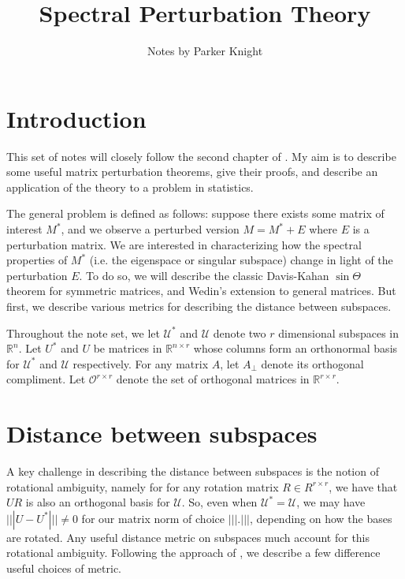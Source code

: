 \documentclass{amsart}
\title{Spectral Perturbation Theory}
\author{Notes by Parker Knight}
\newcommand{\R}{\mathbb{R}}
\newcommand{\calU}{\mathcal{U}}
\newcommand{\calO}{\mathcal{O}}
\begin{document}
\maketitle

\section{Introduction}

This set of notes will closely follow the second chapter of \cite{chen_spectral_2021}. My aim is to describe some useful matrix perturbation theorems, give their proofs, and describe an application of the theory to a problem in statistics.

The general problem is defined as follows: suppose there exists some matrix of interest $M^{*}$, and we observe a perturbed version $M = M^{*} + E$ where $E$ is a perturbation matrix. We are interested in characterizing how the spectral properties of $M^{*}$ (i.e. the eigenspace or singular subspace) change in light of the perturbation $E$. To do so, we will describe the classic Davis-Kahan $\sin \Theta$ theorem for symmetric matrices, and Wedin's extension to general matrices. But first, we describe various metrics for describing the distance between subspaces.

Throughout the note set, we let $\calU^{*}$ and $\calU$ denote two $r$ dimensional subspaces in $\R^{n}$. Let $U^{*}$ and $U$ be matrices in $\R^{n \times r}$ whose columns form an orthonormal basis for $\calU^{*}$ and $\calU$ respectively. For any matrix $A$, let $A_{\perp}$ denote its orthogonal compliment. Let $\calO^{r \times r}$ denote the set of orthogonal matrices in $\R^{r \times r}$.

\section{Distance between subspaces}

A key challenge in describing the distance between subspaces is the notion of rotational ambiguity, namely for for any rotation matrix $R \in R^{r \times r}$, we have that $UR$ is also an orthogonal basis for $\calU$. So, even when $\calU^{*} = \calU$, we may have $|||U - U^*||| \neq 0$ for our matrix norm of choice $||| . |||$, depending on how the bases are rotated. Any useful distance metric on subspaces much account for this rotational ambiguity. Following the approach of \cite{chen_spectral_2021}, we describe a few difference useful choices of metric.
\end{document}
